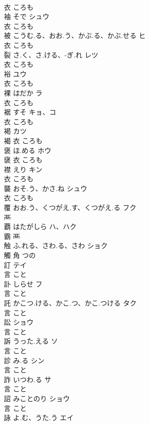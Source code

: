 \documentclass[8pt]{extreport}
\begin{document}
\begin{CJK}{UTF8}{min}
\\	衣		ころも		
\\	袖	そで	シュウ	
\\	衣		ころも		
\\	被	こうむ.る、おお.う、かぶ.る、かぶ.せる	ヒ	
\\	衣		ころも		
\\	裂	さ.く、さ.ける、-ぎ.れ	レツ	
\\	衣		ころも		
\\	裕		ユウ	
\\	衣		ころも		
\\	裸	はだか	ラ	
\\	衣		ころも		
\\	裾	すそ	キョ、コ	
\\	衣		ころも		
\\	褐		カツ	
\\	褐	衣		ころも		
\\	褒	ほ.める	ホウ	
\\	襃	衣		ころも		
\\	襟	えり	キン	
\\	衣		ころも		
\\	襲	おそ.う、かさ.ね	シュウ	
\\	衣		ころも		
\\	覆	おお.う、くつがえ.す、くつがえ.る	フク	
\\	襾				
\\	覇	はたがしら	ハ、ハク	
\\	霸	襾				
\\	触	ふ.れる、さわ.る、さわ	ショク	
\\	觸	角		つの		
\\	訂		テイ	
\\	言		こと		
\\	訃	しらせ	フ	
\\	言		こと		
\\	託	かこつ.ける、かこ.つ、かこ.つける	タク	
\\	言		こと		
\\	訟		ショウ	
\\	言		こと		
\\	訴	うった.える	ソ	
\\	言		こと		
\\	診	み.る	シン	
\\	言		こと		
\\	詐	いつわ.る	サ	
\\	言		こと		
\\	詔	みことのり	ショウ	
\\	言		こと		
\\	詠	よ.む、うた.う	エイ	

\end{CJK}
\end{document}
